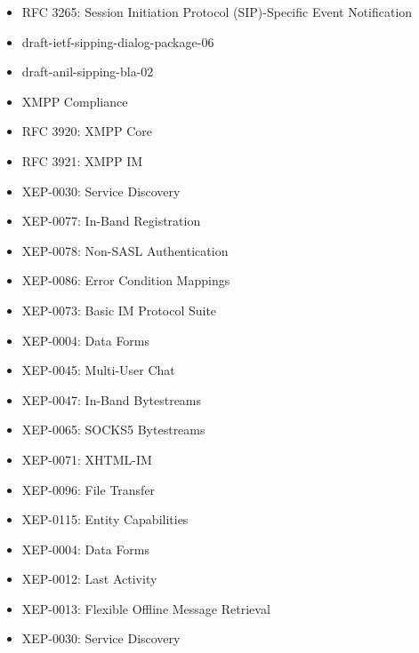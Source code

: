\documentclass[letterpaper,10pt,english]{sphinxmanual}
\begin{document}
\begin{itemize}
\item {} 
RFC 3265: Session Initiation Protocol (SIP)-Specific Event Notification

\item {} 
draft-ietf-sipping-dialog-package-06

\item {} 
draft-anil-sipping-bla-02

\item {} 
XMPP Compliance

\item {} 
RFC 3920: XMPP Core

\item {} 
RFC 3921: XMPP IM

\item {} 
XEP-0030: Service Discovery

\item {} 
XEP-0077: In-Band Registration

\item {} 
XEP-0078: Non-SASL Authentication

\item {} 
XEP-0086: Error Condition Mappings

\item {} 
XEP-0073: Basic IM Protocol Suite

\item {} 
XEP-0004: Data Forms

\item {} 
XEP-0045: Multi-User Chat

\item {} 
XEP-0047: In-Band Bytestreams

\item {} 
XEP-0065: SOCKS5 Bytestreams

\item {} 
XEP-0071: XHTML-IM

\item {} 
XEP-0096: File Transfer

\item {} 
XEP-0115: Entity Capabilities

\item {} 
XEP-0004: Data Forms

\item {} 
XEP-0012: Last Activity

\item {} 
XEP-0013: Flexible Offline Message Retrieval

\item {} 
XEP-0030: Service Discovery


\end{itemize}
\end{document}
